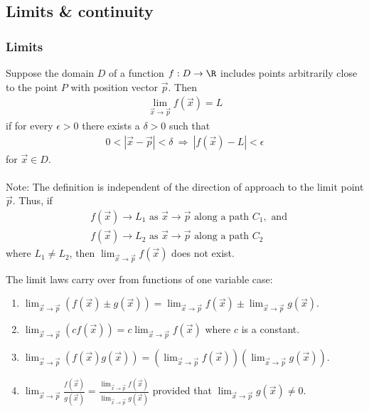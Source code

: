 \documentclass{article}
\begin{document}
\subsection{Limits \& continuity}


\subsubsection{Limits}

\begin{definition}
    Suppose the domain $D$ of a function $f:D\to\R$ includes points
    arbitrarily close to the point $P$ with position vector $\vec p$.
    Then
    \begin{align*}
        \lim_{\vec x\to \vec p}f(\vec x)=L
    \end{align*}
    if for every $\epsilon>0$ there exists a $\delta > 0$ such that
    \begin{align*}
        0 < |\vec x - \vec p| < \delta \:\Rightarrow\: |f(\vec x)-L|<\epsilon
    \end{align*}
    for $\vec x \in D$.\\\\
    Note: The definition is independent of the direction of approach to the
    limit point $\vec p$. Thus, if
    \begin{align*}
         & f(\vec x)\to L_1 \text{ as } \vec x\to\vec p \text{ along a path } C_1, \text{ and} \\
         & f(\vec x)\to L_2 \text{ as } \vec x\to\vec p \text{ along a path } C_2
    \end{align*}
    where $L_1 \not= L_2$, then $\lim_{\vec x\to\vec p} f(\vec x)$ does not exist.
\end{definition}
\begin{theorem}
    The limit laws carry over from functions of one variable case:
    \begin{enumerate}
        \item $\lim_{\vec x\to\vec p}\left(f(\vec x)\pm g(\vec x)\right) =
                  \lim_{\vec x\to\vec p}f(\vec x)\pm\lim_{\vec x\to\vec p}g(\vec x)$.
        \item $\lim_{\vec x\to\vec p}\left(cf(\vec x)\right) =
                  c\lim_{\vec x\to\vec p}f(\vec x)$ where $c$ is a constant.
        \item $\lim_{\vec x\to\vec p}\left(f(\vec x)g(\vec x)\right) =
                  \left(\lim_{\vec x\to\vec p}f(\vec x)\right)
                  \left(\lim_{\vec x\to\vec p}g(\vec x)\right)$.
        \item $\lim_{\vec x\to\vec p}\frac{f(\vec x)}{g(\vec x)}
                  =\frac{\lim_{\vec x\to\vec p}f(\vec x)}{\lim_{\vec x\to\vec p}g(\vec x)}$
              provided that $\lim_{\vec x\to\vec p}g(\vec x)\not=0$.
    \end{enumerate}
\end{theorem}
\end{document}
